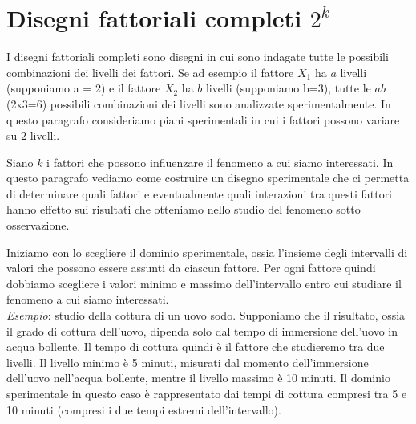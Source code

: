 \documentclass[
  11pt,
]{book}
\begin{document}
\hypertarget{disegni-fattoriali-completi-2k}{%
\section{\texorpdfstring{Disegni fattoriali completi \(2^k\)}{Disegni fattoriali completi 2\^{}k}}\label{disegni-fattoriali-completi-2k}}

I disegni fattoriali completi sono disegni in cui sono indagate tutte le
possibili combinazioni dei livelli dei fattori. Se ad esempio il fattore
\(X_1\) ha \(a\) livelli (supponiamo a = 2) e il fattore \(X_2\) ha \(b\)
livelli (supponiamo b=3), tutte le \(ab\) (2x3=6) possibili combinazioni
dei livelli sono analizzate sperimentalmente. In questo paragrafo
consideriamo piani sperimentali in cui i fattori possono variare su \(2\)
livelli.

Siano \(k\) i fattori che possono influenzare il fenomeno a cui siamo
interessati. In questo paragrafo vediamo come costruire un disegno
sperimentale che ci permetta di determinare quali fattori e
eventualmente quali interazioni tra questi fattori hanno effetto sui
risultati che otteniamo nello studio del fenomeno sotto osservazione.

Iniziamo con lo scegliere il dominio sperimentale, ossia l'insieme degli
intervalli di valori che possono essere assunti da ciascun fattore. Per
ogni fattore quindi dobbiamo scegliere i valori minimo e massimo
dell'intervallo entro cui studiare il fenomeno a cui siamo interessati.\\
\emph{Esempio}: studio della cottura di un uovo sodo. Supponiamo che il
risultato, ossia il grado di cottura dell'uovo, dipenda solo dal tempo
di immersione dell'uovo in acqua bollente. Il tempo di cottura quindi è
il fattore che studieremo tra due livelli. Il livello minimo è 5 minuti,
misurati dal momento dell'immersione dell'uovo nell'acqua bollente,
mentre il livello massimo è 10 minuti. Il dominio sperimentale in questo
caso è rappresentato dai tempi di cottura compresi tra 5 e 10 minuti
(compresi i due tempi estremi dell'intervallo).
\end{document}
